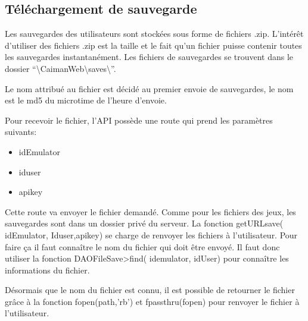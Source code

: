 \documentclass[a4paper,12pt,french]{sphinxmanual}
\begin{document}
\subsection{Téléchargement de sauvegarde}
\label{\detokenize{organique:telechargement-de-sauvegarde}}
\sphinxAtStartPar
Les sauvegardes des utilisateurs sont stockées sous forme de fichiers .zip. L’intérêt d’utiliser des fichiers .zip est la taille et le fait qu’un fichier puisse contenir toutes les sauvegardes instantanément. Les fichiers de sauvegardes se trouvent dans le dossier “\textbackslash{}CaimanWeb\textbackslash{}saves\textbackslash{}”.

\sphinxAtStartPar
Le nom attribué au fichier est décidé au premier envoie de sauvegardes, le nom est le md5 du microtime de l’heure d’envoie.

\sphinxAtStartPar
Pour recevoir le fichier, l’API possède une route qui prend les paramètres suivants:
\begin{itemize}
\item {} 
\sphinxAtStartPar
idEmulator

\item {} 
\sphinxAtStartPar
iduser

\item {} 
\sphinxAtStartPar
apikey

\end{itemize}

\sphinxAtStartPar
Cette route va envoyer le fichier demandé. Comme pour les fichiers des jeux, les sauvegardes sont dans un dossier privé du serveur. La fonction getURLsave( idEmulator, Iduser,apikey) se charge de renvoyer les fichiers à l’utilisateur. Pour faire ça il faut connaître le nom du fichier qui doit être envoyé. Il faut donc utiliser la fonction DAOFileSave\sphinxhyphen{}>find( idemulator, idUser) pour connaître les informations du fichier.

\sphinxAtStartPar
Désormais que le nom du fichier est connu, il est possible de retourner le fichier grâce à la fonction fopen(path,’rb’) et fpassthru(fopen) pour renvoyer le fichier à l’utilisateur.
\end{document}
